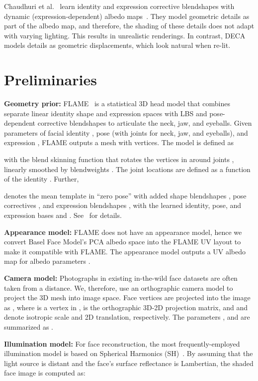 \documentclass[final]{cvpr}
\newcommand{\qheading}[1]{\noindent\textbf{#1}}
\newcommand{\modelname}{DECA\xspace}
\begin{document}
Chaudhuri et al.~\cite{chaudhuri2020personalized} learn identity and expression corrective blendshapes with dynamic (expression-dependent) albedo maps~\cite{Nagano2018}. 
They model geometric details as part of the albedo map, and therefore, the shading of these details does not adapt with varying lighting. 
This results in unrealistic renderings.
In contrast, \modelname models details as geometric displacements, which look natural when re-lit.  \section{Preliminaries}
\label{FLAMEDECODER}

\qheading{Geometry prior:}
FLAME~\cite{FLAME2017} is a statistical 3D head model that combines separate linear identity shape and expression spaces with \ac{LBS} and pose-dependent corrective blendshapes to articulate the neck, jaw, and eyeballs.
Given parameters of facial identity , pose  (with  joints for neck, jaw, and eyeballs), and expression , FLAME outputs a mesh with  vertices. 
The model is defined as

with the blend skinning function  that rotates the vertices in  around joints , linearly smoothed by blendweights . The joint locations  are defined as a function of the identity . Further,

denotes the mean template  in ``zero pose'' with added shape blendshapes , pose correctives , and expression blendshapes , with the learned identity, pose, and expression bases  and . See~\cite{FLAME2017} for details.

\qheading{Appearance model:}
FLAME does not have an appearance model, hence we convert Basel Face Model's PCA albedo space \cite{Paysan2009} into the FLAME UV layout to make it compatible with FLAME.
The appearance model outputs a UV albedo map  for albedo parameters .

\qheading{Camera model:}
Photographs in existing in-the-wild face datasets are often taken from a distance.
We, therefore, use an orthographic camera model  to project the 3D mesh into image space. 
Face vertices are projected into the image as , where  is a vertex in ,  is the orthographic 3D-2D projection matrix, and  and  denote isotropic scale and 2D translation, respectively.
The parameters , and  are summarized as .

\qheading{Illumination model:}
For face reconstruction, the most frequently-employed illumination model is based on Spherical Harmonics (SH)~\cite{M1966Spherical}. 
By assuming that the light source is distant and the face's surface reflectance is Lambertian, the shaded face image is computed as:
\end{document}
